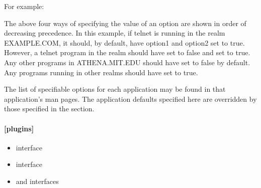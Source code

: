 \documentclass[letterpaper,10pt,english]{sphinxmanual}
\begin{document}
\sphinxAtStartPar
For example:

\begin{sphinxVerbatim}[commandchars=\\\{\}]
\PYG{p}{[}\PYG{p}{]}
      
          
              
      
          
          
      
          
      
\end{sphinxVerbatim}

\sphinxAtStartPar
The above four ways of specifying the value of an option are shown in
order of decreasing precedence. In this example, if telnet is running
in the realm EXAMPLE.COM, it should, by default, have option1 and
option2 set to true.  However, a telnet program in the realm
 should have  set to false and
 set to true.  Any other programs in ATHENA.MIT.EDU should
have  set to false by default.  Any programs running in
other realms should have  set to true.

\sphinxAtStartPar
The list of specifiable options for each application may be found in
that application’s man pages.  The application defaults specified here
are overridden by those specified in the {\hyperref[\detokenize{admin/conf_files/krb5_conf:realms}]{}} section.


\paragraph{{[}plugins{]}}
\label{\detokenize{admin/conf_files/krb5_conf:plugins}}\label{\detokenize{admin/conf_files/krb5_conf:id6}}\begin{itemize}
\item {} 
\sphinxAtStartPar
{\hyperref[\detokenize{admin/conf_files/krb5_conf:pwqual}]{}} interface

\item {} 
\sphinxAtStartPar
{\hyperref[\detokenize{admin/conf_files/krb5_conf:kadm5-hook}]{}} interface

\item {} 
\sphinxAtStartPar
{\hyperref[\detokenize{admin/conf_files/krb5_conf:clpreauth}]{}} and {\hyperref[\detokenize{admin/conf_files/krb5_conf:kdcpreauth}]{}} interfaces

\end{itemize}
\end{document}
